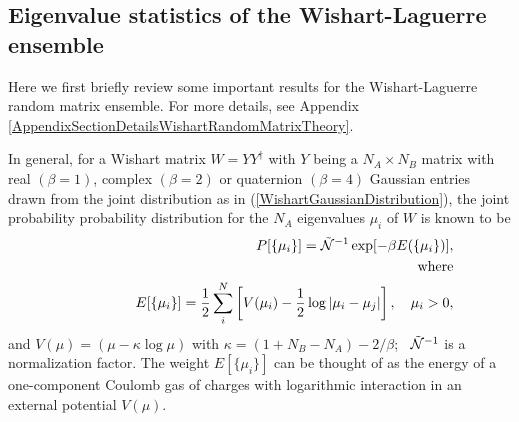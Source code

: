 \documentclass[aps,prb,preprint,onecolumn,amsmath,amssymb,superscriptaddress,eqsecnum,floatfix,scrartcl]{revtex4-1}
\begin{document}



\subsection{Eigenvalue statistics of the Wishart-Laguerre ensemble}
\label{SubSectionWishartRandomMatrixEnsemble}
Here we first briefly review some important results for the Wishart-Laguerre random matrix ensemble.\cite{loggas}
For more details, see Appendix \ref{AppendixSectionDetailsWishartRandomMatrixTheory}.


 In general, for a Wishart matrix $W=YY^{\dag}$ with $Y$ being a $N_A\times N_B$ matrix with real $(\beta=1)$, complex $(\beta=2)$ or quaternion $(\beta=4)$ Gaussian entries drawn from the joint distribution
as in (\ref{WishartGaussianDistribution}),
the joint probability probability  distribution for the $N_A$ eigenvalues  $\mu_i$ of 
 $W$ is known to be\cite{loggas} 
\begin{eqnarray}
\label{log_gas}
&&
\qquad \qquad  P[\{\mu_i\}]=
 {\cal {\tilde  N}}^{-1}
 \exp[-\beta E(\{\mu_i\})], 
\\ \nonumber
&& {\rm where} \\ \nonumber
&&
\qquad 
\qquad E[\{\mu_i\}]=\frac{1}{2}\sum_i^N
\left [ 
V(\mu_i) -\frac{1}{2}\log|\mu_i-\mu_j|
\right ],
\quad \mu_i>0,
\end{eqnarray}
and
$V(\mu)=(\mu-\kappa \log \mu)$ with
$\kappa=(1+N_B-N_A)-2/\beta$;
 \  ${\cal {\tilde  N}}^{-1}$ is a normalization factor.
The weight
$E[\{\mu_i\}]$
can be thought of 
as the energy of a one-component Coulomb gas of charges with 
logarithmic interaction 
in an  external potential 
$V(\mu)$.
\end{document}
